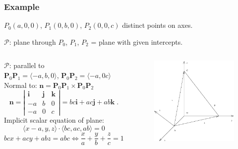 \begin{frame}
 \frametitle{Example}

$P_0(a,0,0)$, $P_1(0,b,0)$, $P_2(0,0,c)$ distinct points on axes.

$\mathcal{P}$: plane through $P_0$, $P_1$, $P_2$ = plane with given intercepts.

\bigskip

\begin{columns}
  \column{7cm}
  $\mathcal{P}$: parallel to \\
  $\textbf{P}_0\textbf{P}_1 = \langle -a, b, 0\rangle$,
    $\textbf{P}_0\textbf{P}_2 = \langle -a, 0 c\rangle$\\
    Normal to:
$\textbf{n} = \textbf{P}_0\textbf{P}_1 \times \textbf{P}_0\textbf{P}_2$
$$\textbf{n} =
\left| \begin{array}{ccc}
        \textbf{i} & \textbf{j} & \textbf{k} \\
	-a & b & 0 \\
        -a & 0 & c
       \end{array}
 \right| = bc \textbf{i} + ac \textbf{j} + ab \textbf{k}\; .$$
Implicit scalar equation of plane:
%
$$\langle x-a, y, z \rangle \cdot \langle bc, ac, ab \rangle = 0$$
%
$$bcx+acy + abz = abc \Longleftrightarrow \boxed{\frac{x}{a} + \frac{y}{b} + \frac{z}{c} = 1}$$
  \column{5.5cm}
     \begin{figure}
        \includegraphics[width=2in]{../images/ok-plane_intercepts.eps}
    \end{figure}
\end{columns}
\end{frame}

